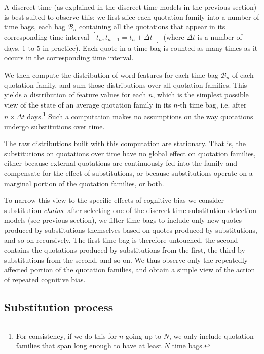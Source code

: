 A discreet time (as explained in the discreet-time models in the previous section) is best suited to observe this: we first slice each quotation family into a number of time bags, each bag $\mathcal{B}_n$ containing all the quotations that appear in its corresponding time interval $\left[ t_n, t_{n + 1} = t_n + \Delta t \right[$ (where $\Delta t$ is a number of days, 1 to 5 in practice).
Each quote in a time bag is counted as many times as it occurs in the corresponding time interval.

We then compute the distribution of word features for each time bag $\mathcal{B}_n$ of each quotation family, and sum those distributions over all quotation families.
This yields a distribution of feature values for each $n$, which is the simplest possible view of the state of an average quotation family in its $n$-th time bag, i.e. after $n \times \Delta t$ days.\footnote{For consistency, if we do this for $n$ going up to $N$, we only include quotation families that span long enough to have at least $N$ time bags.}
Such a computation makes no assumptions on the way quotations undergo substitutions over time.

The raw distributions built with this computation are stationary.
That is, the substitutions on quotations over time have no global effect on quotation families, either because external quotations are continuously fed into the family and compensate for the effect of substitutions, or because substitutions operate on a marginal portion of the quotation families, or both.

\bigskip
To narrow this view to the specific effects of cognitive bias we consider substitution \emph{chains}: after selecting one of the discreet-time substitution detection models (see previous section), we filter time bags to include only new quotes produced by substitutions themselves based on quotes produced by substitutions, and so on recursively.
The first time bag is therefore untouched, the second contains the quotations produced by substitutions from the first, the third by substitutions from the second, and so on.
We thus observe only the repeatedly-affected portion of the quotation families, and obtain a simple view of the action of repeated cognitive bias.

\subsection{Substitution process}

